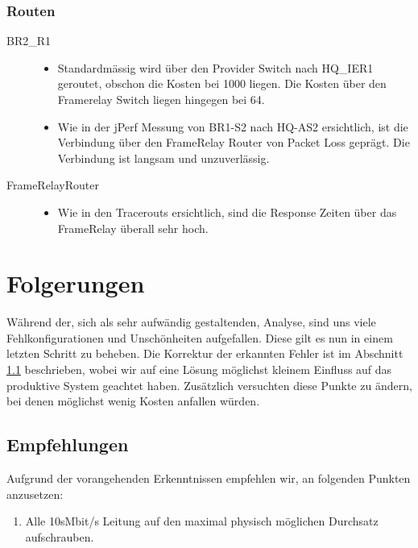 \subsubsection{Routen}
\begin{description}
	\item[BR2\_R1] \hfill 
		\begin{itemize}
			\item Standardmässig wird über den Provider Switch nach HQ\_IER1 geroutet, obschon die Kosten bei 1000 liegen. Die Kosten über den Framerelay Switch liegen hingegen bei 64.
			\item Wie in der jPerf Messung von BR1-S2 nach HQ-AS2 ersichtlich, ist die Verbindung über den FrameRelay Router von Packet Loss geprägt. Die Verbindung ist langsam und unzuverlässig.
		\end{itemize}
	\item[FrameRelayRouter] \hfill
		\begin{itemize}
			\item Wie in den Tracerouts ersichtlich, sind die Response Zeiten über das FrameRelay überall sehr hoch.
		\end{itemize}
\end{description}

\section{Folgerungen}
Während der, sich als sehr aufwändig gestaltenden, Analyse, sind uns viele Fehlkonfigurationen und Unschönheiten aufgefallen. Diese gilt es nun in einem letzten Schritt zu beheben. Die Korrektur der erkannten Fehler ist im Abschnitt \ref{sec:recommedations} beschrieben, wobei wir auf eine Lösung möglichst kleinem Einfluss auf das produktive System geachtet haben. Zusätzlich versuchten diese Punkte zu ändern, bei denen möglichst wenig Kosten anfallen würden.

\subsection{Empfehlungen}
\label{sec:recommedations}
Aufgrund der vorangehenden Erkenntnissen empfehlen wir, an folgenden Punkten anzusetzen:
\begin{enumerate}
	\item Alle 10sMbit/s Leitung auf den maximal physisch möglichen Durchsatz aufschrauben.
\end{enumerate}

